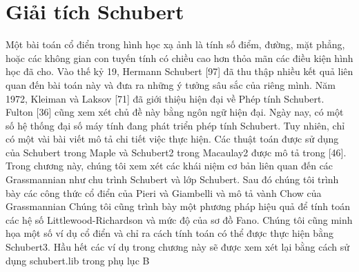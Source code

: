 \documentclass[11pt,a4paper]{book}
\begin{document}
\chapter{Giải tích Schubert}
Một bài toán cổ điển trong hình học xạ ảnh là tính số điểm, đường, mặt phẳng, hoặc các không gian con tuyến tính có chiều cao hơn thỏa mãn các điều kiện hình học đã cho. Vào thế kỷ 19, Hermann Schubert [97] đã thu thập nhiều kết quả liên quan đến bài toán này và đưa ra những ý tưởng sâu sắc của riêng mình. Năm 1972, Kleiman và Laksov [71] đã giới thiệu hiện đại về Phép tính Schubert. Fulton [36] cũng xem xét chủ đề này bằng ngôn ngữ hiện đại. Ngày nay, có một số hệ thống đại số máy tính đang phát triển phép tính Schubert. Tuy nhiên, chỉ có một vài bài viết mô tả chi tiết việc thực hiện. Các thuật toán được sử dụng của Schubert trong Maple và Schubert2 trong Macaulay2 được mô tả trong [46]. Trong chương này, chúng tôi xem xét các khái niệm cơ bản liên quan đến các Grassmannian như chu trình Schubert và lớp Schubert. Sau đó chúng tôi trình bày các công thức cổ điển của Pieri và Giambelli và mô tả vành Chow của Grassmannian Chúng tôi cũng trình bày một phương pháp hiệu quả để tính toán các hệ số Littlewood-Richardson và mức độ của sơ đồ Fano. Chúng tôi cũng minh họa một số ví dụ cổ điển và chỉ ra cách tính toán có thể được thực hiện bằng Schubert3. Hầu hết các ví dụ trong chương này sẽ được xem xét lại bằng cách sử dụng schubert.lib trong phụ lục B
\end{document}
